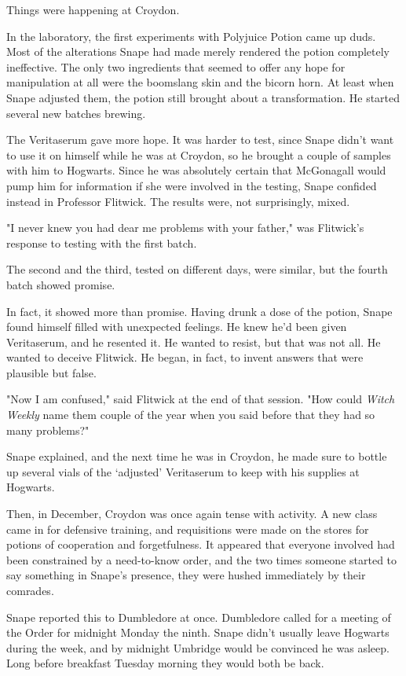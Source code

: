 Things were happening at Croydon.

In the laboratory, the first experiments with Polyjuice Potion came up duds. Most of the alterations Snape had made merely rendered the potion completely ineffective. The only two ingredients that seemed to offer any hope for manipulation at all were the boomslang skin and the bicorn horn. At least when Snape adjusted them, the potion still brought about a transformation. He started several new batches brewing.

The Veritaserum gave more hope. It was harder to test, since Snape didn't want to use it on himself while he was at Croydon, so he brought a couple of samples with him to Hogwarts. Since he was absolutely certain that McGonagall would pump him for information if she were involved in the testing, Snape confided instead in Professor Flitwick. The results were, not surprisingly, mixed.

"I never knew you had{\el} dear me{\el} problems with your father," was Flitwick's response to testing with the first batch.

The second and the third, tested on different days, were similar, but the fourth batch showed promise.

In fact, it showed more than promise. Having drunk a dose of the potion, Snape found himself filled with unexpected feelings. He knew he'd been given Veritaserum, and he resented it. He wanted to resist, but that was not all. He wanted to deceive Flitwick. He began, in fact, to invent answers that were plausible but false.

"Now I am confused," said Flitwick at the end of that session. "How could \emph{Witch Weekly} name them couple of the year when you said before that they had so many problems?"

Snape explained, and the next time he was in Croydon, he made sure to bottle up several vials of the `adjusted' Veritaserum to keep with his supplies at Hogwarts.

Then, in December, Croydon was once again tense with activity. A new class came in for defensive training, and requisitions were made on the stores for potions of cooperation and forgetfulness. It appeared that everyone involved had been constrained by a need-to-know order, and the two times someone started to say something in Snape's presence, they were hushed immediately by their comrades.

Snape reported this to Dumbledore at once. Dumbledore called for a meeting of the Order for midnight Monday the ninth. Snape didn't usually leave Hogwarts during the week, and by midnight Umbridge would be convinced he was asleep. Long before breakfast Tuesday morning they would both be back.

